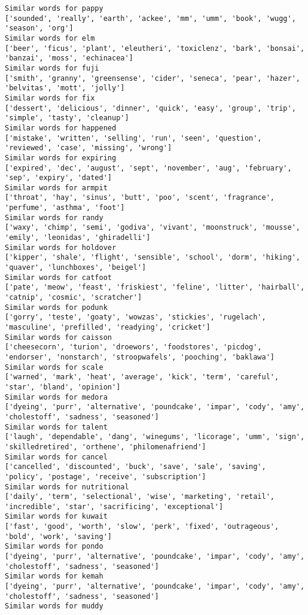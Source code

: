 \documentclass[11pt]{article}
\begin{document}
\begin{Verbatim}[commandchars=\\\{\}]
Similar words for pappy
['sounded', 'really', 'earth', 'ackee', 'mm', 'umm', 'book', 'wugg', 'season', 'org']
Similar words for elm
['beer', 'ficus', 'plant', 'eleutheri', 'toxiclenz', 'bark', 'bonsai', 'banzai', 'moss', 'echinacea']
Similar words for fuji
['smith', 'granny', 'greensense', 'cider', 'seneca', 'pear', 'hazer', 'belvitas', 'mott', 'jolly']
Similar words for fix
['dessert', 'delicious', 'dinner', 'quick', 'easy', 'group', 'trip', 'simple', 'tasty', 'cleanup']
Similar words for happened
['mistake', 'written', 'selling', 'run', 'seen', 'question', 'reviewed', 'case', 'missing', 'wrong']
Similar words for expiring
['expired', 'dec', 'august', 'sept', 'november', 'aug', 'february', 'sep', 'expiry', 'dated']
Similar words for armpit
['throat', 'hay', 'sinus', 'butt', 'poo', 'scent', 'fragrance', 'perfume', 'asthma', 'foot']
Similar words for randy
['waxy', 'chimp', 'semi', 'godiva', 'vivant', 'moonstruck', 'mousse', 'emily', 'leonidas', 'ghiradelli']
Similar words for holdover
['kipper', 'shale', 'flight', 'sensible', 'school', 'dorm', 'hiking', 'quaver', 'lunchboxes', 'beigel']
Similar words for catfoot
['pate', 'meow', 'feast', 'friskiest', 'feline', 'litter', 'hairball', 'catnip', 'cosmic', 'scratcher']
Similar words for podunk
['gorry', 'teste', 'goaty', 'wowzas', 'stickies', 'rugelach', 'masculine', 'prefilled', 'readying', 'cricket']
Similar words for caisson
['cheesecorn', 'turion', 'droewors', 'foodstores', 'picdog', 'endorser', 'nonstarch', 'stroopwafels', 'pooching', 'baklawa']
Similar words for scale
['warned', 'mark', 'heat', 'average', 'kick', 'term', 'careful', 'star', 'bland', 'opinion']
Similar words for medora
['dyeing', 'purr', 'alternative', 'poundcake', 'impar', 'cody', 'amy', 'cholestoff', 'sadness', 'seasoned']
Similar words for talent
['laugh', 'dependable', 'dang', 'winegums', 'licorage', 'umm', 'sign', 'skilledretired', 'orthene', 'philomenafriend']
Similar words for cancel
['cancelled', 'discounted', 'buck', 'save', 'sale', 'saving', 'policy', 'postage', 'receive', 'subscription']
Similar words for nutritional
['daily', 'term', 'selectional', 'wise', 'marketing', 'retail', 'incredible', 'star', 'sacrificing', 'exceptional']
Similar words for kuwait
['fast', 'good', 'worth', 'slow', 'perk', 'fixed', 'outrageous', 'bold', 'work', 'saving']
Similar words for pondo
['dyeing', 'purr', 'alternative', 'poundcake', 'impar', 'cody', 'amy', 'cholestoff', 'sadness', 'seasoned']
Similar words for kemah
['dyeing', 'purr', 'alternative', 'poundcake', 'impar', 'cody', 'amy', 'cholestoff', 'sadness', 'seasoned']
Similar words for muddy

\end{Verbatim}
\end{document}
